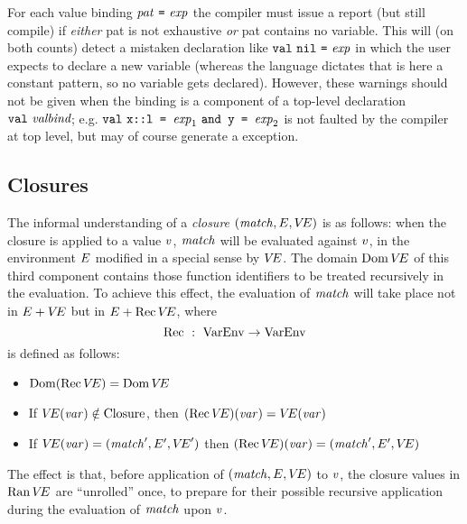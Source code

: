 
For each value binding $\pat\ \mbox{\ml{=}}\ \exp$ the compiler must issue a 
report (but still compile) if {\it either} pat is not exhaustive {\it or}
pat contains no variable. This will (on both counts) detect a mistaken
declaration like ${\tt val}\ {\tt nil}\ \mbox{{\tt =}}\ {\it exp}$ in which the user
expects to declare a new variable  (whereas the language dictates
that  is here a constant pattern, so no variable gets declared).
However, these warnings should not be given when the binding is a component
of a top-level declaration $\mbox{{\tt val}\ {\it valbind}}$; e.g. 
 ${\tt val}\ \mbox{{\tt x::l = }}{\it exp}_1\ \mbox{{\tt {\tt and}\ y = }}{\it exp}_2$ 
is not faulted by the compiler at top level, but may of course generate
a  exception.

\subsection{Closures}
The informal understanding of a {\sl closure} $({\it match},E,\mbox{$V\!E$})$ is as follows:
when the closure is applied to a value $v$,
${\it match}$ will be evaluated against $v$, in the environment $E$ modified in
a special sense by
$\mbox{$V\!E$}$.  The domain $\mathop{\rm Dom}\nolimits\mbox{$V\!E$}$ of this third component contains those function
identifiers to be treated recursively in the evaluation.  To achieve this
effect, the evaluation of ${\it match}$ will take place not in $E + \mbox{$V\!E$}$
but in $E + \mathop{\rm Rec}\nolimits\mbox{$V\!E$}$, where
\[ \mathop{\rm Rec}\nolimits\ :\ {\rm VarEnv}\to{\rm VarEnv} \]
is defined as follows:
\begin{itemize}
\item $\mathop{\rm Dom}\nolimits(\mathop{\rm Rec}\nolimits\mbox{$V\!E$})=\mathop{\rm Dom}\nolimits\mbox{$V\!E$} $
\item If $\mbox{$V\!E$}({\it var})\notin{\rm Closure}$, then $(\mathop{\rm Rec}\nolimits\mbox{$V\!E$})({\it var})=\mbox{$V\!E$}({\it var})$
\item If $\mbox{$V\!E$}({\it var})=({\it match}',E',\mbox{$V\!E$}')$
      then $(\mathop{\rm Rec}\nolimits\mbox{$V\!E$})({\it var})=({\it match}',E',\mbox{$V\!E$})$
\end{itemize}
The effect is that, before application of $({\it match},E,\mbox{$V\!E$})$ to $v$, the
closure values in $\mathop{\rm Ran}\nolimits\mbox{$V\!E$}$ are ``unrolled'' once, to prepare for their possible
recursive application during the evaluation of ${\it match}$ upon $v$.


